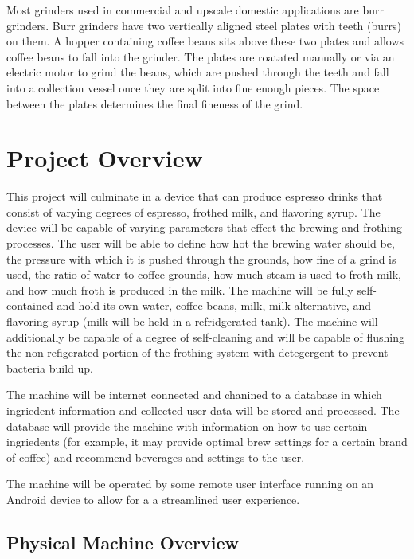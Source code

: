 \documentclass[conference]{IEEEtran}
\begin{document}
Most grinders used in commercial and upscale domestic applications are burr
grinders. Burr grinders have two vertically aligned steel plates with teeth
(burrs) on them. A hopper containing coffee beans sits above these two plates
and allows coffee beans to fall into the grinder.
The plates are roatated manually or via an electric motor to grind the beans,
which are pushed through the teeth and fall into a collection vessel once they
are split into fine enough pieces.
The space between the plates determines the final fineness of the grind.


\section{Project Overview}

This project will culminate in a device that can produce espresso drinks that
consist of varying degrees of espresso, frothed milk, and flavoring syrup. The
device will be capable of varying parameters that effect the brewing and
frothing processes. The user will be able to define how hot the brewing water
should be, the pressure with which it is pushed through the grounds, how fine of
a grind is used, the ratio of water to coffee grounds, how much steam is used to
froth milk, and how much froth is produced in the milk. The machine will be
fully self-contained and hold its own water, coffee beans, milk, milk
alternative, and flavoring syrup (milk will be held in a refridgerated tank).
The machine will additionally be capable of a degree of self-cleaning and will
be capable of flushing the non-refigerated portion of the frothing system with
detegergent to prevent bacteria build up.

The machine will be internet connected and chanined to a database in which
ingriedent information and collected user data will be stored and processed. The
database will provide the machine with information on how to use certain
ingriedents (for example, it may provide optimal brew settings for a certain
brand of coffee) and recommend beverages and settings to the user.

The machine will be operated by some remote user interface running on an Android
device to allow for a a streamlined user experience.

\subsection{Physical Machine Overview}
\end{document}
